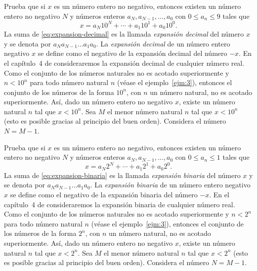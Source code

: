 \documentclass[12pt,a4paper]{book}
\begin{document}
    \begin{ejercicio}\label{ej:72}
        Prueba que si $x$ es un número entero
        no negativo, entonces existen un número entero no negativo $N$ y números
        enteros $a_{N},a_{N-1},\ldots,a_{0}$ con $0\leq a_{n}\leq 9$ tales que
        \begin{equation}\label{eq:expansion-decimal}
            x=a_{N}10^{N}+\cdots+a_{1}10^{1}+a_{0}10^{0}.
        \end{equation}
        La suma de \eqref{eq:expansion-decimal} es la llamada \textit{expansión decimal} del número $x$ y se denota
        por $a_{N}a_{N-1}\ldots a_{1}a_{0}$. La \textit{expansión decimal} de un número entero negativo $x$
        se define como el negativo de la expansión decimal del número $-x$. En el
        capítulo~4 de \cite{nunez2020calculoII} consideraremos la expansión decimal de cualquier número
        real. \sugerencia Como el conjunto de los números naturales no es acotado
        superiormente y $n<10^{n}$ para todo número natural $n$ (véase el ejemplo~\ref{ejm:3}),
        entonces el conjunto de los números de la forma $10^{n}$, con $n$ un número natural,
        no es acotado superiormente. Así, dado un número entero no negativo $x$,
        existe un número natural $n$ tal que $x<10^{n}$. Sea $M$ el menor número natural
        $n$ tal que $x<10^{n}$ (esto es posible gracias al principio del buen orden).
        Considera el número $N=M-1$.
    \end{ejercicio}

    \begin{ejercicio}\label{ej:73}
        Prueba que si $x$ es un número entero
        no negativo, entonces existen un número entero no negativo $N$ y números
        enteros $a_{N},a_{N-1},\ldots,a_{0}$ con $0\leq a_{n}\leq 1$ tales que
        \begin{equation}\label{eq:expansion-binaria}
            x=a_{N}2^{N}+\cdots+a_{1}2^{1}+a_{0}2^{0}.
        \end{equation}
        La suma de \eqref{eq:expansion-binaria} es la llamada \textit{expansión binaria} del número $x$ y se denota
        por $a_{N}a_{N-1}\ldots a_{1}a_{0}$. La \textit{expansión binaria} de un número entero negativo $x$
        se define como el negativo de la expansión binaria del número $-x$. En el
        capítulo~4 de \cite{nunez2020calculoII} consideraremos la expansión binaria de cualquier número
        real. \sugerencia Como el conjunto de los números naturales no es acotado
        superiormente y $n<2^{n}$ para todo número natural $n$ (véase el ejemplo~\ref{ejm:3}),
        entonces el conjunto de los números de la forma $2^{n}$, con $n$ un número natural,
        no es acotado superiormente. Así, dado un número entero no negativo $x$,
        existe un número natural $n$ tal que $x<2^{n}$. Sea $M$ el menor número natural $n$
        tal que $x<2^{n}$ (esto es posible gracias al principio del buen orden). Considera
        el número $N=M-1$.
    \end{ejercicio}
\end{document}
